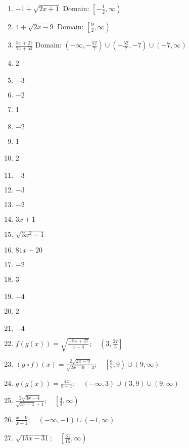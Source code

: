 \begin{enumerate}
	\item $-1 + \sqrt{2x+1}$ Domain: $\left[-\frac{1}{2}, \infty\right)$
	\item $4 + \sqrt{2x-9}$ Domain: $\left[\frac{9}{2}, \infty\right)$
	\item $\frac{3x+21}{7x+52}$ Domain: $\left(-\infty, -\frac{52}{7}\right) \cup \left(-\frac{52}{7}, -7\right) \cup (-7, \infty)$
	\item 2
     \item $-3$
     \item $-2$
     \item 1
     \item $-2$
     \item 1
     \item 2
     \item $-3$
     \item $-3$
     \item $-2$
     \item $3x + 1$
    \item $\sqrt{3x^2-1}$
    \item $81x-20$
    \item $-2$
    \item 3
    \item $-4$
    \item 2
    \item $-4$
    \item $f(g(x)) = \sqrt{\frac{-5x+27}{x-3}}; \quad \left(3, \frac{27}{5}\right]$
    \item $(g \circ f)(x) = \frac{2\sqrt{2x-9}}{\sqrt{2x-9}-3}; \quad \left[\frac{9}{2},9\right) \cup (9, \infty)$
    \item $g(g(x)) = \frac{4x}{9-x}; \quad (-\infty, 3) \cup (3, 9) \cup (9, \infty)$
    \item $\frac{2\sqrt{3x-4}}{\sqrt{3x-4}+1}; \quad  \left[\frac{4}{3}, \infty\right)$
    \item $\frac{x-9}{x+1}; \quad (-\infty, -1) \cup (-1, \infty)$
    \item $\sqrt{15x-31}; \quad \left[\frac{31}{15}, \infty\right)$
\end{enumerate}